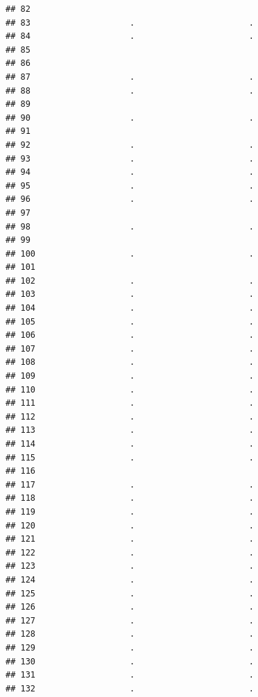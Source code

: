 \documentclass[
]{article}
\begin{document}
\begin{verbatim}
## 82                                             
## 83                    .                       .
## 84                    .                       .
## 85                                             
## 86                                             
## 87                    .                       .
## 88                    .                       .
## 89                                             
## 90                    .                       .
## 91                                             
## 92                    .                       .
## 93                    .                       .
## 94                    .                       .
## 95                    .                       .
## 96                    .                       .
## 97                                             
## 98                    .                       .
## 99                                             
## 100                   .                       .
## 101                                            
## 102                   .                       .
## 103                   .                       .
## 104                   .                       .
## 105                   .                       .
## 106                   .                       .
## 107                   .                       .
## 108                   .                       .
## 109                   .                       .
## 110                   .                       .
## 111                   .                       .
## 112                   .                       .
## 113                   .                       .
## 114                   .                       .
## 115                   .                       .
## 116                                            
## 117                   .                       .
## 118                   .                       .
## 119                   .                       .
## 120                   .                       .
## 121                   .                       .
## 122                   .                       .
## 123                   .                       .
## 124                   .                       .
## 125                   .                       .
## 126                   .                       .
## 127                   .                       .
## 128                   .                       .
## 129                   .                       .
## 130                   .                       .
## 131                   .                       .
## 132                   .                       .

\end{verbatim}
\end{document}
